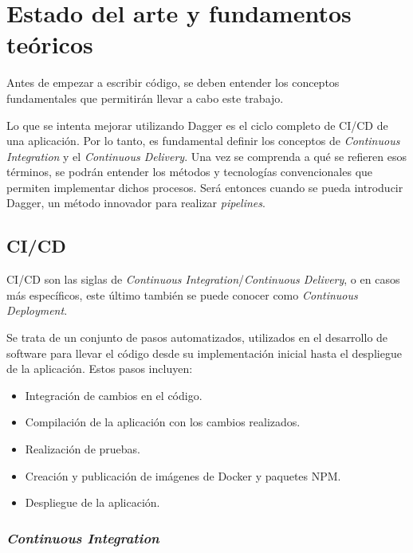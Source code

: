 \chapter{Estado del arte y fundamentos teóricos}

Antes de empezar a escribir código, se deben entender los conceptos fundamentales que permitirán llevar a cabo este trabajo.

Lo que se intenta mejorar utilizando Dagger es el ciclo completo de CI/CD de una aplicación. Por lo tanto, es fundamental definir los conceptos de \textit{Continuous Integration} y el \textit{Continuous Delivery}. Una vez se comprenda a qué se refieren esos términos, se podrán entender los métodos y tecnologías convencionales que permiten implementar dichos procesos. Será entonces cuando se pueda introducir Dagger, un método innovador para realizar \textit{pipelines}.

\section{CI/CD}

CI/CD son las siglas de \textit{Continuous Integration}/\textit{Continuous Delivery}, o en casos más específicos, este último también se puede conocer como \textit{Continuous Deployment}.

Se trata de un conjunto de pasos automatizados, utilizados en el desarrollo de software para llevar el código desde su implementación inicial hasta el despliegue de la aplicación. Estos pasos incluyen:

\begin{itemize}
  \item Integración de cambios en el código.
  \item Compilación de la aplicación con los cambios realizados.
  \item Realización de pruebas.
  \item Creación y publicación de imágenes de Docker y paquetes NPM.
  \item Despliegue de la aplicación.
\end{itemize}

\subsection*{\textit{Continuous Integration}}
\label{subsec:CI}

